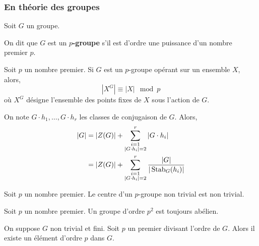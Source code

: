   \subsubsection{En théorie des groupes}


  Soit $G$ un groupe.

  \begin{definition}
    On dit que $G$ est un \textbf{$p$-groupe} s'il est d'ordre une puissance d'un nombre premier $p$.
  \end{definition}

  \begin{proposition}
    Soit $p$ un nombre premier. Si $G$ est un $p$-groupe opérant sur un ensemble $X$, alors,
    \[ |X^G| \equiv |X| \mod p \]
    où $X^G$ désigne l'ensemble des points fixes de $X$ sous l'action de $G$.
  \end{proposition}

  \begin{corollary}
    On note $G \cdot h_1, \dots, G \cdot h_r$ les classes de conjugaison de $G$. Alors,
    \begin{align*}
      \vert G \vert &= \vert Z(G) \vert + \sum_{\substack{i=1 \\ \vert G \cdot h_i \vert = 2}}^{r} \vert G \cdot h_i \vert \\
      &= \vert Z(G) \vert + \sum_{\substack{i=1 \\ \vert G \cdot h_i \vert = 2}}^{r} \frac{\vert G \vert}{\vert \operatorname{Stab}_G(h_i) \vert}
    \end{align*}
  \end{corollary}

  \begin{corollary}
    Soit $p$ un nombre premier. Le centre d'un $p$-groupe non trivial est non trivial.
  \end{corollary}

  \begin{corollary}
    Soit $p$ un nombre premier. Un groupe d'ordre $p^2$ est toujours abélien.
  \end{corollary}

  \begin{application}
    On suppose $G$ non trivial et fini. Soit $p$ un premier divisant l'ordre de $G$. Alors il existe un élément d'ordre $p$ dans $G$.
  \end{application}
  
  
